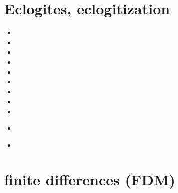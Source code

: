 \section{Eclogites, eclogitization}

\begin{small}
\begin{itemize}
\item[2001]
\item[2007]
\item[2009]
\item[2013]
\item[2016]
\item[2018]
\item[2019]
\item[2022]
\item[2023]
\item[\twothousandtwentyfour]
 \\
\item[\twothousandtwentyfive]
 \\
\end{itemize}
\end{small}



\section{finite differences (FDM)}

